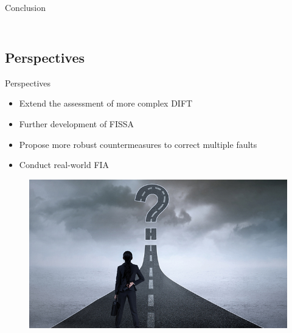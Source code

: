 \begin{frame}{Conclusion}
\begin{columns}
\begin{column}{.3\linewidth}
\begin{figure}
            \end{figure}
        \end{column}
    \end{columns}
\end{frame}

\subsection{Perspectives}
\begin{frame}{Perspectives}
    \begin{block}{}
        \begin{itemize}
            [triangle]
            \item Extend the assessment of more complex DIFT
            \item Further development of FISSA
            \item Propose more robust countermeasures to correct multiple faults
            \item Conduct real-world FIA
        \end{itemize}
    \end{block}

    \begin{figure}
        \centering
        \includegraphics[height=.25\textheight]{src/6_conclusion/img/perspectives.jpg}
    \end{figure}
\end{frame}

